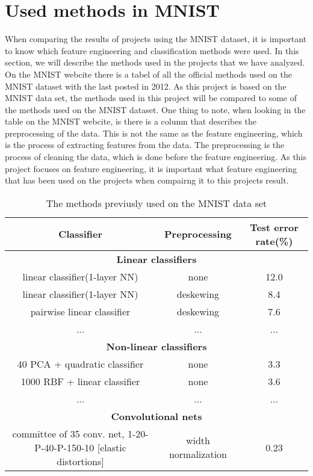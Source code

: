 \section{Used methods in MNIST}
\label{sec:method-MNIST}
When comparing the results of projects using the MNIST dataset, it is important to know which feature engineering and classification methods were used. In this section, we will describe the methods used in the projects that we have analyzed. 
On the MNIST webcite \cite{MNIST} there is a tabel of all the official methods used on the MNIST dataset with the last posted in 2012. As this project is based on the MNIST data set, the methods used in this project will be compared to some of the methods used on the MNIST dataset. One thing to note, when looking in the table on the MNIST webcite, is there is a column that describes the preprocessing of the data. 
This is not the same as the feature engineering, which is the process of extracting features from the data. The preprocessing is the process of cleaning the data, which is done before the feature engineering. As this project focuses on feature engineering, it is important what feature engineering that has been used on the projects when compairng it to this projects result. 
\begin{table}[h]
  \centering
  \resizebox{1\textwidth}{!}
  {
  \begin{tabular}{|c|c|c|}
      \hline
      Classifier & Preprocessing & Test error rate(\%)\\
      \hline
      \multicolumn{3}{|c|}{\textbf{Linear classifiers}} \\
      \hline
      linear classifier(1-layer NN) & none & 12.0 \\
      linear classifier(1-layer NN) & deskewing & 8.4 \\
      pairwise linear classifier & deskewing & 7.6 \\
      \hline
      ... & ... & ... \\ 
      \hline
      \multicolumn{3}{|c|}{\textbf{Non-linear classifiers}} \\
      \hline
      40 PCA + quadratic classifier & none & 3.3 \\
      1000 RBF + linear classifier & none & 3.6 \\
      \hline
      ... & ... & ... \\ 
      \hline
      \multicolumn{3}{|c|}{\textbf{Convolutional nets}} \\
      \hline
      committee of 35 conv. net, 1-20-P-40-P-150-10 [elastic distortions] & width normalization & 0.23 \\
      \hline
  \end{tabular}
  }
  \caption{The methods previusly used on the MNIST data set}
  \label{tab:method-MNIST}
\end{table}
